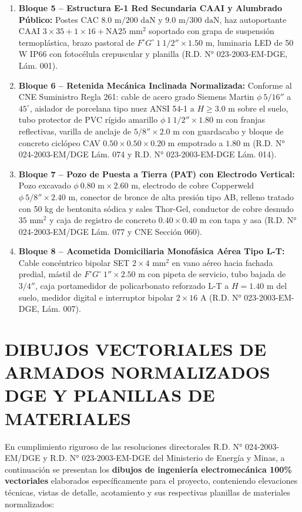 \begin{enumerate}
    \item \textbf{Bloque 5 -- Estructura E-1 Red Secundaria CAAI y Alumbrado Público:} Postes CAC $8.0\text{ m} / 200\text{ daN}$ y $9.0\text{ m} / 300\text{ daN}$, haz autoportante CAAI $3 \times 35 + 1 \times 16 + \text{NA} 25\text{ mm}^2$ soportado con grapa de suspensión termoplástica, brazo pastoral de $F^\circ G^\circ\ 1\ 1/2'' \times 1.50\text{ m}$, luminaria LED de 50 W IP66 con fotocélula crepuscular y planilla (R.D. N° 023-2003-EM-DGE, Lám. 001).
    \item \textbf{Bloque 6 -- Retenida Mecánica Inclinada Normalizada:} Conforme al CNE Suministro Regla 261: cable de acero grado Siemens Martin $\phi\ 5/16''$ a $45^\circ$, aislador de porcelana tipo nuez ANSI 54-1 a $H \ge 3.0\text{ m}$ sobre el suelo, tubo protector de PVC rígido amarillo $\phi\ 1\ 1/2'' \times 1.80\text{ m}$ con franjas reflectivas, varilla de anclaje de $5/8'' \times 2.0\text{ m}$ con guardacabo y bloque de concreto ciclópeo CAV $0.50 \times 0.50 \times 0.20\text{ m}$ empotrado a $1.80\text{ m}$ (R.D. N° 024-2003-EM/DGE Lám. 074 y R.D. N° 023-2003-EM-DGE Lám. 014).
    \item \textbf{Bloque 7 -- Pozo de Puesta a Tierra (PAT) con Electrodo Vertical:} Pozo excavado $\phi\ 0.80\text{ m} \times 2.60\text{ m}$, electrodo de cobre Copperweld $\phi\ 5/8'' \times 2.40\text{ m}$, conector de bronce de alta presión tipo AB, relleno tratado con 50 kg de bentonita sódica y sales Thor-Gel, conductor de cobre desnudo $35\text{ mm}^2$ y caja de registro de concreto $0.40 \times 0.40\text{ m}$ con tapa y asa (R.D. N° 024-2003-EM/DGE Lám. 077 y CNE Sección 060).
    \item \textbf{Bloque 8 -- Acometida Domiciliaria Monofásica Aérea Tipo L-T:} Cable concéntrico bipolar SET $2 \times 4\text{ mm}^2$ en vano aéreo hacia fachada predial, mástil de $F^\circ G^\circ\ 1'' \times 2.50\text{ m}$ con pipeta de servicio, tubo bajada de $3/4''$, caja portamedidor de policarbonato reforzado L-T a $H = 1.40\text{ m}$ del suelo, medidor digital e interruptor bipolar $2 \times 16\text{ A}$ (R.D. N° 023-2003-EM-DGE, Lám. 007).
\end{enumerate}

\newpage
\section{DIBUJOS VECTORIALES DE ARMADOS NORMALIZADOS DGE Y PLANILLAS DE MATERIALES}

En cumplimiento riguroso de las resoluciones directorales R.D. N° 024-2003-EM/DGE y R.D. N° 023-2003-EM-DGE del Ministerio de Energía y Minas, a continuación se presentan los \textbf{dibujos de ingeniería electromecánica 100\% vectoriales} elaborados específicamente para el proyecto, conteniendo elevaciones técnicas, vistas de detalle, acotamiento y sus respectivas planillas de materiales normalizados:

